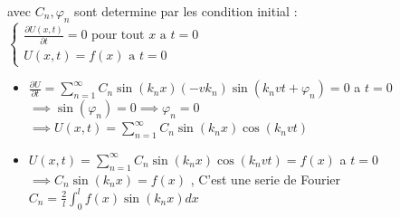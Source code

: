 \documentclass[12pt]{book}
\begin{document}
            avec $C_n , \varphi_n$ sont determine par les condition initial :$\begin{cases}\frac{\partial U(x,t)}{\partial t} = 0  \text{ pour tout } x \text{ a } t = 0 \\ U(x,t) =f(x)   \text{ a } t =0\end{cases}$\\
            \begin{itemize}
                \item $\frac{\partial U}{\partial t} =\sum^\infty_{n=1}C_n\sin(k_nx)(-vk_n)\sin(k_nvt+\varphi_n)  =0$ a $t =0$\\
                    $\implies \sin(\varphi_n)=0 \implies \varphi_n=0$ \\
                    $\implies U(x,t) = \sum^\infty_{n=1}C_n\sin(k_nx)\cos(k_nvt)$
                \item $ U(x,t) = \sum^\infty_{n=1}C_n\sin(k_nx)\cos(k_nvt) =f(x) $ a $t=0$ \\
                        $\implies C_n\sin(k_nx) =f(x) $ , C'est une serie de Fourier  \\
                        $C_n = \frac{2}{l}\int^l_0f(x)\sin(k_nx)dx $
            \end{itemize}
        \pagebreak
\end{document}
